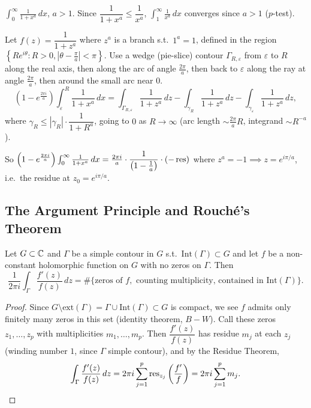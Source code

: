 \documentclass[11pt]{article}
\begin{document}
\begin{example}
$\displaystyle\int_0^\infty \frac{1}{1+x^a}\,dx$, $a>1$. Since $\dfrac{1}{1+x^a} \le \dfrac{1}{x^a}$, $\int_1^\infty \frac{1}{x^a}\,dx$ converges since $a>1$ ($p$-test).

Let $f(z) = \dfrac{1}{1+z^a}$ where $z^a$ is a branch s.t.\ $1^a=1$, defined in the region $\left\{Re^{i\theta} : R>0, |\theta-\tfrac\pi a|<\pi\right\}$. Use a wedge (pie-slice) contour $\Gamma_{R,\varepsilon}$ from $\varepsilon$ to $R$ along the real axis, then along the arc of angle $\frac{2\pi}{a}$, then back to $\varepsilon$ along the ray at angle $\frac{2\pi}{a}$, then around the small arc near $0$.
\[
\left(1-e^{\frac{2\pi i}{a}}\right)\int_\varepsilon^R \frac{1}{1+x^a}\,dx = \int_{\Gamma_{R,\varepsilon}} \frac{1}{1+z^a}\,dz - \int_{\gamma_R} \frac{1}{1+z^a}\,dz - \int_{\gamma_\varepsilon} \frac{1}{1+z^a}\,dz,
\]
where $\gamma_R \le |\gamma_R|\cdot\dfrac{1}{1+R^a}$, going to $0$ as $R\to\infty$ (arc length $\sim \frac{2\pi}{a}R$, integrand $\sim R^{-a}$).

So $\left(1-e^{\frac{2\pi i}{a}}\right)\int_0^\infty \frac{1}{1+x^a}\,dx = \frac{2\pi i}{a}\cdot\dfrac{1}{\left(1-\frac1a\right)}\cdot\left(-\operatorname{res}\right)$ where $z^a=-1 \implies z=e^{i\pi/a}$, i.e.\ the residue at $z_0=e^{i\pi/a}$.
\end{example}

\subsection{The Argument Principle and Rouch\'e's Theorem}

\begin{theorem}
Let $G\subset{\mathbb{C}}$ and $\Gamma$ be a simple contour in $G$ s.t.\ $\mathrm{Int}(\Gamma)\subset G$ and let $f$ be a non-constant holomorphic function on $G$ with no zeros on $\Gamma$. Then
\[
\frac{1}{2\pi i}\int_\Gamma \frac{f'(z)}{f(z)}\,dz = \#\{\text{zeros of } f, \text{ counting multiplicity, contained in } \mathrm{Int}(\Gamma)\}.
\]
\end{theorem}

\begin{proof}
Since $G\setminus\mathrm{ext}(\Gamma) = \Gamma\cup\mathrm{Int}(\Gamma) \subset G$ is compact, we see $f$ admits only finitely many zeros in this set (identity theorem, $B-W$). Call these zeros $z_1,\dots,z_p$ with multiplicities $m_1,\dots,m_p$. Then $\dfrac{f'(z)}{f(z)}$ has residue $m_j$ at each $z_j$ (winding number $1$, since $\Gamma$ simple contour), and by the Residue Theorem,
\[
\int_\Gamma \frac{f'(z)}{f(z)}\,dz = 2\pi i \sum_{j=1}^p \operatorname{res}_{z_j}\left(\frac{f'}{f}\right) = 2\pi i \sum_{j=1}^p m_j. \qedhere
\]
\end{proof}
\end{document}

